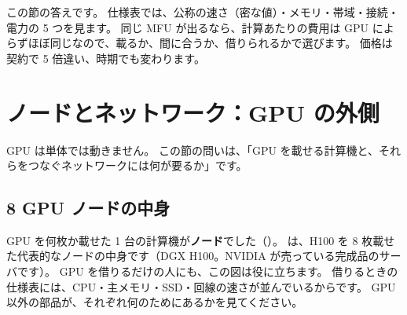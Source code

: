この節の答えです。
仕様表では、公称の速さ（密な値）・メモリ・帯域・接続・電力の 5 つを見ます。
同じ MFU が出るなら、計算あたりの費用は GPU によらずほぼ同じなので、載るか、間に合うか、借りられるかで選びます。
価格は契約で 5 倍違い、時期でも変わります。

\section{ノードとネットワーク：GPU の外側}\label{sec:infra-node}

GPU は単体では動きません。
この節の問いは、「GPU を載せる計算機と、それらをつなぐネットワークには何が要るか」です。

\subsection*{8 GPU ノードの中身}

GPU を何枚か載せた 1 台の計算機が\textbf{ノード}でした（）。
は、H100 を 8 枚載せた代表的なノードの中身です（DGX H100。NVIDIA が売っている完成品のサーバです）。
GPU を借りるだけの人にも、この図は役に立ちます。
借りるときの仕様表には、CPU・主メモリ・SSD・回線の速さが並んでいるからです。
GPU 以外の部品が、それぞれ何のためにあるかを見てください。

